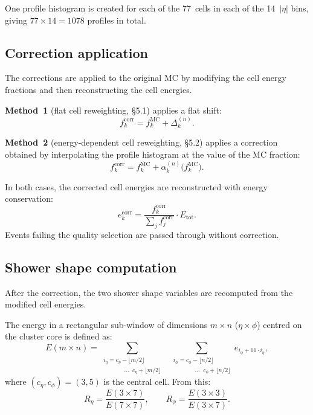 \documentclass[12pt,a4paper]{article}
\begin{document}
One profile histogram is created for each of the 77~cells in each of the
14~$|\eta|$ bins, giving $77\times 14 = 1078$ profiles in total.

\subsection{Correction application}
\label{sec:method:apply}

The corrections are applied to the original MC by modifying the cell energy
fractions and then reconstructing the cell energies.

\textbf{Method~1} (flat cell reweighting, §5.1) applies a flat shift:
\begin{equation}
  f_k^\text{corr} = f_k^\text{MC} + \Delta_k^{(n)}.
  \label{eq:m1apply}
\end{equation}

\textbf{Method~2} (energy-dependent cell reweighting, §5.2) applies a
correction obtained by interpolating the profile histogram at the value of
the MC fraction:
\begin{equation}
  f_k^\text{corr} = f_k^\text{MC}
    + \alpha_k^{(n)}\!\bigl(f_k^\text{MC}\bigr).
  \label{eq:m2apply}
\end{equation}

In both cases, the corrected cell energies are reconstructed with energy
conservation:
\begin{equation}
  e_k^\text{corr} = \frac{f_k^\text{corr}}{\sum_j f_j^\text{corr}}
  \cdot E_\text{tot}.
  \label{eq:correnergycons}
\end{equation}
Events failing the quality selection are passed through without correction.

\subsection{Shower shape computation}
\label{sec:method:shapes}

After the correction, the two shower shape variables are recomputed from
the modified cell energies.

The energy in a rectangular sub-window of dimensions $m\times n$
($\eta\times\phi$) centred on the cluster core is defined as:
\begin{equation}
  E(m\times n) =
  \sum_{\substack{
    i_\eta = c_\eta - \lfloor m/2\rfloor \\
    \phantom{i_\eta = c_\eta}\;\;\ldots\;\;c_\eta + \lfloor m/2\rfloor
  }}
  \;\;
  \sum_{\substack{
    i_\phi = c_\phi - \lfloor n/2\rfloor \\
    \phantom{i_\phi = c_\phi}\;\;\ldots\;\;c_\phi + \lfloor n/2\rfloor
  }}
  e_{i_\phi + 11 \cdot i_\eta},
  \label{eq:subwindow}
\end{equation}
where $(c_\eta, c_\phi) = (3,5)$ is the central cell. From this:
\begin{equation}
  R_\eta = \frac{E(3\times7)}{E(7\times7)},
  \qquad
  R_\phi = \frac{E(3\times3)}{E(3\times7)}.
  \label{eq:retarphi}
\end{equation}
\end{document}
